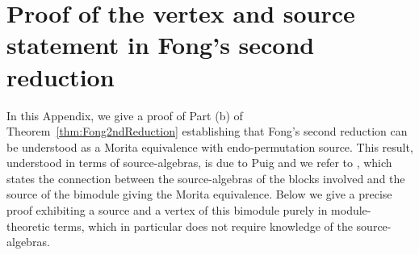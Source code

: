 


\appendix
\section{Proof of the vertex and source statement in Fong's second reduction}\label{app:A}%


In this Appendix, we give a proof of Part (b) of Theorem~\ref{thm:Fong2ndReduction} establishing that Fong's second reduction can be understood as a Morita equivalence with endo-permutation source. This result, understood in terms of source-algebras, is due to Puig and we refer to \cite[Theorem~9.11.9] {LinckelmannVol2}, which states the connection between the source-algebras of the blocks involved and the source of the bimodule giving the Morita equivalence.  Below we give a precise proof exhibiting a source and a vertex of this bimodule purely in module-theoretic terms, which in particular does not require knowledge of the source-algebras. 





